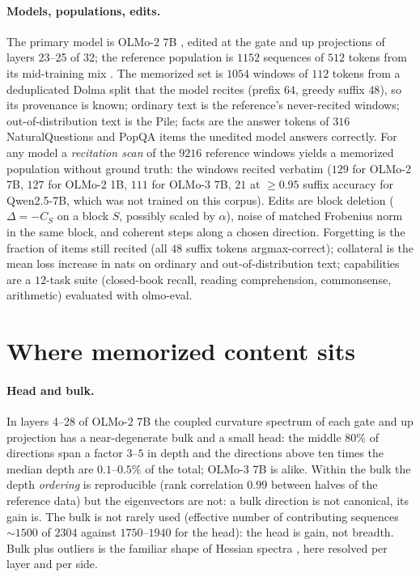 \documentclass{article}
\theoremstyle{definition}\newtheorem{law}{Empirical law}
\begin{document}
\paragraph{Models, populations, edits.} The primary model is OLMo-2 7B \citep{olmo2024olmo2}, edited at the gate and up projections of layers 23--25 of 32; the reference population is $1152$ sequences of $512$ tokens from its mid-training mix \citep{dolmino2024}. The memorized set is $1054$ windows of $112$ tokens from a deduplicated Dolma split that the model recites (prefix $64$, greedy suffix $48$), so its provenance is known; ordinary text is the reference's never-recited windows; out-of-distribution text is the Pile; facts are the answer tokens of $316$ NaturalQuestions and PopQA items the unedited model answers correctly. For any model a \emph{recitation scan} of the $9216$ reference windows yields a memorized population without ground truth: the windows recited verbatim ($129$ for OLMo-2 7B, $127$ for OLMo-2 1B, $111$ for OLMo-3 7B, $21$ at $\ge0.95$ suffix accuracy for Qwen2.5-7B, which was not trained on this corpus). Edits are block deletion ($\Delta=-C_S$ on a block $S$, possibly scaled by $\alpha$), noise of matched Frobenius norm in the same block, and coherent steps along a chosen direction. Forgetting is the fraction of items still recited (all $48$ suffix tokens argmax-correct); collateral is the mean loss increase in nats on ordinary and out-of-distribution text; capabilities are a $12$-task suite (closed-book recall, reading comprehension, commonsense, arithmetic) evaluated with olmo-eval.

\section{Where memorized content sits}\label{sec:laws}

\paragraph{Head and bulk.} In layers 4--28 of OLMo-2 7B the coupled curvature spectrum of each gate and up projection has a near-degenerate bulk and a small head: the middle $80\%$ of directions span a factor $3$--$5$ in depth and the directions above ten times the median depth are $0.1$--$0.5\%$ of the total; OLMo-3 7B is alike. Within the bulk the depth \emph{ordering} is reproducible (rank correlation $0.99$ between halves of the reference data) but the eigenvectors are not: a bulk direction is not canonical, its gain is. The bulk is not rarely used (effective number of contributing sequences $\sim1500$ of $2304$ against $1750$--$1940$ for the head): the head is gain, not breadth. Bulk plus outliers is the familiar shape of Hessian spectra \citep{sagun2017empirical,papyan2019measurements}, here resolved per layer and per side.
\end{document}
